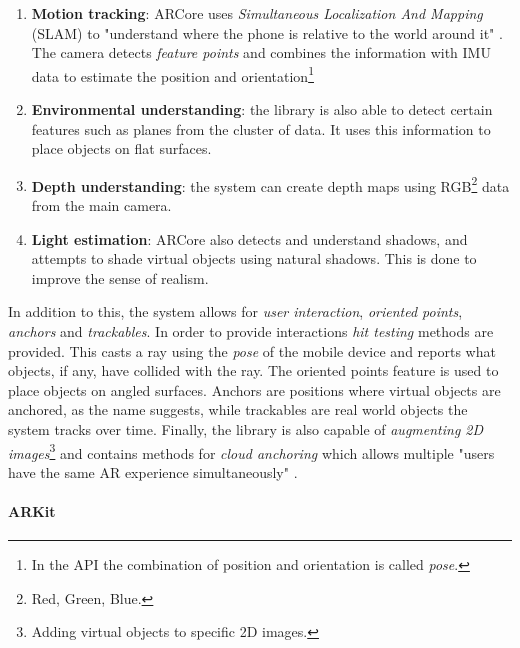 \begin{enumerate}
    \item \textbf{Motion tracking}: ARCore uses \textit{Simultaneous Localization And Mapping} (SLAM) to "understand where the phone is relative to the world around it" \cite{Fundamen38online}. The camera detects \textit{feature points} and combines the information with IMU data to estimate the position and orientation\footnote{In the API the combination of position and orientation is called \textit{pose}.}
    \item \textbf{Environmental understanding}: the library is also able to detect certain features such as planes from the cluster of data. It uses this information to place objects on flat surfaces. 
    \item \textbf{Depth understanding}: the system can create depth maps using RGB\footnote{Red, Green, Blue.} data from the main camera. 
    \item \textbf{Light estimation}: ARCore also detects and understand shadows, and attempts to shade virtual objects using natural shadows. This is done to improve the sense of realism. 
\end{enumerate}


In addition to this, the system allows for\textit{ user interaction}, \textit{oriented points}, \textit{anchors} and \textit{trackables}. In order to provide interactions \textit{hit testing} methods are provided. This casts a ray using the \textit{pose} of the mobile device and reports what objects, if any, have collided with the ray. The oriented points feature is used to place objects on angled surfaces. Anchors are positions where virtual objects are anchored, as the name suggests, while trackables are real world objects the system tracks over time. Finally, the library is also capable of \textit{augmenting 2D images}\footnote{Adding virtual objects to specific 2D images.} and contains methods for \textit{cloud anchoring} which allows multiple "users have the same AR experience simultaneously" \cite{Fundamen38online}.  


\paragraph{ARKit}

